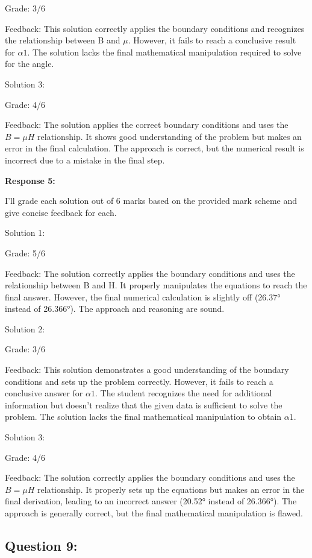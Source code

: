 \documentclass[a4paper,11pt]{article}
\begin{document}
Grade: 3/6

Feedback: This solution correctly applies the boundary conditions and recognizes the relationship between B and \(\mu\). However, it fails to reach a conclusive result for \(\alpha1\). The solution lacks the final mathematical manipulation required to solve for the angle.

Solution 3:

Grade: 4/6

Feedback: The solution applies the correct boundary conditions and uses the \(B = \mu H\) relationship. It shows good understanding of the problem but makes an error in the final calculation. The approach is correct, but the numerical result is incorrect due to a mistake in the final step.

\bigskip
\textbf{Response 5:}

I'll grade each solution out of 6 marks based on the provided mark scheme and give concise feedback for each.

Solution 1:

Grade: 5/6

Feedback:
The solution correctly applies the boundary conditions and uses the relationship between B and H. It properly manipulates the equations to reach the final answer. However, the final numerical calculation is slightly off (26.37° instead of 26.366°). The approach and reasoning are sound.

Solution 2:

Grade: 3/6

Feedback:
This solution demonstrates a good understanding of the boundary conditions and sets up the problem correctly. However, it fails to reach a conclusive answer for \(\alpha1\). The student recognizes the need for additional information but doesn't realize that the given data is sufficient to solve the problem. The solution lacks the final mathematical manipulation to obtain \(\alpha1\).

Solution 3:

Grade: 4/6

Feedback:
The solution correctly applies the boundary conditions and uses the \(B = \mu H\) relationship. It properly sets up the equations but makes an error in the final derivation, leading to an incorrect answer (20.52° instead of 26.366°). The approach is generally correct, but the final mathematical manipulation is flawed.

\subsection*{Question 9:}
\end{document}
